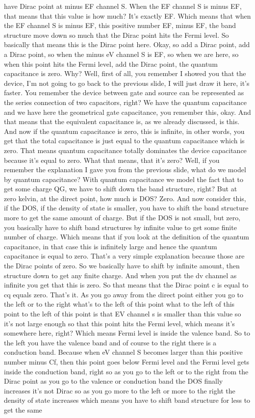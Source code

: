 have Dirac point at minus EF channel S. When the EF channel S is minus EF, that means that this value is how much? It's exactly EF. Which means that when the EF channel S is minus EF, this positive number EF, minus EF, the band structure move down so much that the Dirac point hits the Fermi level. So basically that means this is the Dirac point here. Okay, so add a Dirac point, add a Dirac point, so when the minus eV channel S is EF, so when we are here, so when this point hits the Fermi level, add the Dirac point, the quantum capacitance is zero. Why? Well, first of all, you remember I showed you that the device, I'm not going to go back to the previous slide, I will just draw it here, it's faster. You remember the device between gate and source can be represented as the series connection of two capacitors, right? We have the quantum capacitance and we have here the geometrical gate capacitance, you remember this, okay. And that means that the equivalent capacitance is, as we already discussed, is this. And now if the quantum capacitance is zero, this is infinite, in other words, you get that the total capacitance is just equal to the quantum capacitance which is zero. That means quantum capacitance totally dominates the device capacitance because it's equal to zero. What that means, that it's zero? Well, if you remember the explanation I gave you from the previous slide, what do we model by quantum capacitance? With quantum capacitance we model the fact that to get some charge QG, we have to shift down the band structure, right? But at zero kelvin, at the direct point, how much is DOS? Zero. And now consider this, if the DOS, if the density of state is smaller, you have to shift the band structure more to get the same amount of charge. But if the DOS is not small, but zero, you basically have to shift band structures by infinite value to get some finite number of charge. Which means that if you look at the definition of the quantum capacitance, in that case this is infinitely large and hence the quantum capacitance is equal to zero. That's a very simple explanation because those are the Dirac points of zero. So we basically have to shift by infinite amount, then structure down to get any finite charge. And when you put the dv channel as infinite you get that this is zero. So that means that the Dirac point c is equal to cq equals zero. That's it. As you go away from the direct point either you go to the left or to the right what's to the left of this point what to the left of this point to the left of this point is that EV channel s is smaller than this value so it's not large enough so that this point hits the Fermi level, which means it's somewhere here, right? Which means Fermi level is inside the valence band. So to the left you have the valence band and of course to the right there is a conduction band. Because when eV channel S becomes larger than this positive number minus Cf, then this point goes below Fermi level and the Fermi level gets inside the conduction band, right so as you go to the left or to the right from the Dirac point as you go to the valence or conduction band the DOS finally increases it's not Dirac so as you go more to the left or more to the right the density of state increases which means you have to shift band structure for less to get the same 